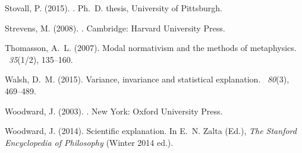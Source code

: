 \documentclass[natbib]{svjour3}                     %
\begin{document}
\begin{thebibliography}{19}
Stovall, P. (2015).
.
\newblock Ph.\ D. thesis, University of Pittsburgh.

Strevens, M. (2008).
.
\newblock Cambridge: Harvard University Press.

Thomasson, A.~L. (2007).
\newblock Modal normativism and the methods of metaphysics.
~{\em 35\/}(1/2), 135--160.

Walsh, D.~M. (2015).
\newblock Variance, invariance and statistical explanation.
~{\em 80\/}(3), 469--489.

Woodward, J. (2003).
.
\newblock New York: Oxford University Press.

Woodward, J. (2014).
\newblock Scientific explanation.
\newblock In E.~N. Zalta (Ed.), {\em The Stanford Encyclopedia of Philosophy\/}
(Winter 2014 ed.).

\end{thebibliography}
\end{document}

